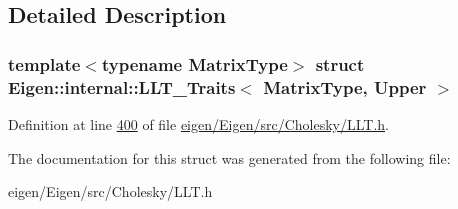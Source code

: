 \subsection{Detailed Description}
\subsubsection*{template$<$typename Matrix\+Type$>$\newline
struct Eigen\+::internal\+::\+L\+L\+T\+\_\+\+Traits$<$ Matrix\+Type, Upper $>$}



Definition at line \hyperlink{eigen_2_eigen_2src_2_cholesky_2_l_l_t_8h_source_l00400}{400} of file \hyperlink{eigen_2_eigen_2src_2_cholesky_2_l_l_t_8h_source}{eigen/\+Eigen/src/\+Cholesky/\+L\+L\+T.\+h}.



The documentation for this struct was generated from the following file\+:\begin{DoxyCompactItemize}
\item 
eigen/\+Eigen/src/\+Cholesky/\+L\+L\+T.\+h\end{DoxyCompactItemize}
